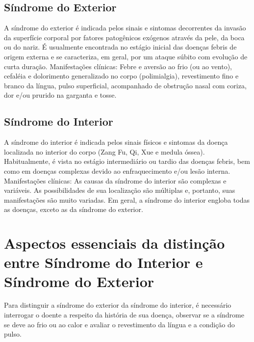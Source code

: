 \documentclass[12pt,oneside,a4paper]{book} %
\begin{document}
\subsection{Síndrome do Exterior}
A síndrome do exterior é indicada pelos sinais e sintomas decorrentes da invasão da superfície corporal por fatores patogênicos exógenos através da pele, da boca ou do nariz. É usualmente encontrada no estágio inicial das doenças febris de origem externa e se caracteriza, em geral, por um ataque súbito com evolução de curta duração.
Manifestações clínicas: Febre e aversão ao frio (ou ao vento), cefaléia e dolorimento generalizado no corpo (polimialgia), revestimento fino e branco da língua, pulso superficial, acompanhado de obstrução nasal com coriza, dor e/ou prurido na garganta e tosse.

\subsection{Síndrome do Interior}
A síndrome do interior é indicada pelos sinais físicos e sintomas da doença localizada no interior do corpo (Zang Fu, Qi, Xue e medula óssea). Habitualmente, é vista no estágio intermediário ou tardio das doenças febris, bem como em doenças complexas devido ao enfraquecimento e/ou lesão interna.
Manifestações clínicas: As causas da síndrome do interior são complexas e variáveis. As possibilidades de sua localização são múltiplas e, portanto, suas manifestações são muito variadas. Em geral, a síndrome do interior engloba todas as doenças, exceto as da síndrome do exterior. 

\section{Aspectos essenciais da distinção entre Síndrome do Interior e Síndrome do Exterior} 
Para distinguir a síndrome do exterior da síndrome do interior, é necessário interrogar o doente a respeito da história de sua doença, observar se a síndrome se deve ao frio ou ao calor e avaliar o revestimento da língua e a condição do pulso.
\end{document}
